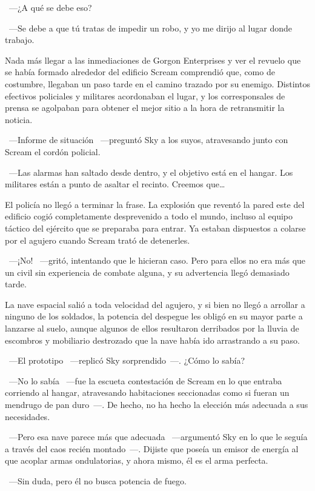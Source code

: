~---¿A qué se debe eso?

~---Se debe a que tú tratas de impedir un robo, y yo me dirijo al lugar donde trabajo.

\parbreak
Nada más llegar a las inmediaciones de Gorgon Enterprises y ver el revuelo que se había formado alrededor del edificio Scream comprendió que, como de costumbre, llegaban un paso tarde en el camino trazado por su enemigo. Distintos efectivos policiales y militares acordonaban el lugar, y los corresponsales de prensa se agolpaban para obtener el mejor sitio a la hora de retransmitir la noticia.

~---Informe de situación ~---preguntó Sky a los suyos, atravesando junto con Scream el cordón policial.

~---Las alarmas han saltado desde dentro, y el objetivo está en el hangar. Los militares están a punto de asaltar el recinto. Creemos que\dots

El policía no llegó a terminar la frase. La explosión que reventó la pared este del edificio cogió completamente desprevenido a todo el mundo, incluso al equipo táctico del ejército que se preparaba para entrar. Ya estaban dispuestos a colarse por el agujero cuando Scream trató de detenerles.

~---¡No! ~---gritó, intentando que le hicieran caso. Pero para ellos no era más que un civil sin experiencia de combate alguna, y su advertencia llegó demasiado tarde.

La nave espacial salió a toda velocidad del agujero, y si bien no llegó a arrollar a ninguno de los soldados, la potencia del despegue les obligó en su mayor parte a lanzarse al suelo, aunque algunos de ellos resultaron derribados por la lluvia de escombros y mobiliario destrozado que la nave había ido arrastrando a su paso.

~---El prototipo ~---replicó Sky sorprendido~---. ¿Cómo lo sabía?

~---No lo sabía ~---fue la escueta contestación de Scream en lo que entraba corriendo al hangar, atravesando habitaciones seccionadas como si fueran un mendrugo de pan duro~---. De hecho, no ha hecho la elección más adecuada a sus necesidades.

~---Pero esa nave parece más que adecuada ~---argumentó Sky en lo que le seguía a través del caos recién montado~---. Dijiste que poseía un emisor de energía al que acoplar armas ondulatorias, y ahora mismo, él es el arma perfecta.

~---Sin duda, pero él no busca potencia de fuego.

